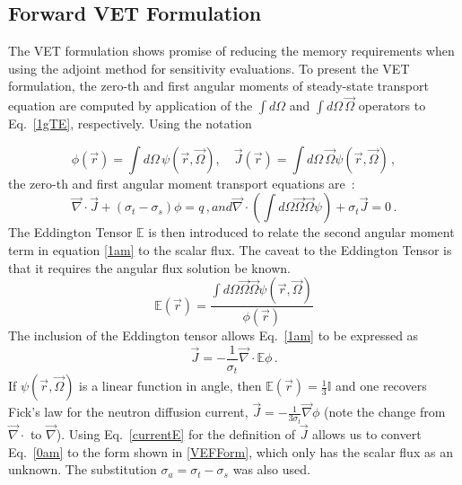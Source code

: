 \documentclass[12pt]{report}
\newcommand{\vr}{\vec{r}}
\newcommand{\vO}{\vec{\Omega}}
\renewcommand{\div}{\vec{\nabla} \cdot}
\newcommand{\grad}{\vec{\nabla}}
\newcommand{\Edd}{\mathbb{E}}
\newcommand{\sigt}{\sigma_t}
\newcommand{\sigs}{\sigma_s}
\newcommand{\siga}{\sigma_a}
\newcommand{\scalSource}{q}
\begin{document}
\subsection{Forward VET Formulation}

The VET formulation shows promise of reducing the memory requirements when using the adjoint method for sensitivity evaluations. To present the VET formulation, the zero-th and first angular moments of steady-state transport equation are computed by application of the $\int d \Omega$ and $\int d \Omega \, \vO$ operators to Eq.~\eqref{1gTE}, respectively. Using the notation

\begin{equation}
\label{VETFormStart}
\phi(\vr)=\int d\Omega \, \psi( \vr,\vO )
,\quad
\vec{J}(\vr)= \int d\Omega \, \vO \psi( \vr,\vO ) \,,
\end{equation}
the zero-th and first angular moment transport equations are~: 
%
\begin{subequations}
%
\begin{equation}
\label{0am}
\div \vec{J} + (\sigt-\sigs) \phi = \scalSource \,,
\end{equation}
and
\begin{equation}
\label{1am}
\div \left(  \int d\Omega \vO \vO \psi \right) + \sigt \vec{J} = 0 \,.
\end{equation}
%
\end{subequations}
The Eddington Tensor $\Edd$ is then introduced to relate the second angular moment term in equation \eqref{1am} to the scalar flux. The caveat to the Eddington Tensor is that it requires the angular flux solution be known.
\begin{equation}
\label{EddDef}
\Edd(\vr)=\frac{\int d\Omega \vO \vO \psi(\vr,\vO)}{\phi(\vr)}
\end{equation}
The inclusion of the Eddington tensor allows Eq.~\eqref{1am} to be expressed as 
\begin{equation}
\label{currentE}
\vec{J} = - \frac{1}{\sigt} \div \Edd \phi \,.
\end{equation}
If $\psi(\vr,\vO)$ is a linear function in angle, then $\Edd(\vr)=\tfrac{1}{3}\mathbb{I}$ and one recovers Fick's law for the neutron diffusion current, $\vec{J} = - \frac{1}{3\sigt} \grad \phi$ (note the change from $\div$ to $\grad$). Using Eq.~\eqref{currentE} for the definition of $\vec{J}$ allows us to convert Eq.~\eqref{0am} to the form shown in \eqref{VEFForm}, which only has the scalar flux as an unknown. The substitution $\siga = \sigt-\sigs$ was also used.
\end{document}
